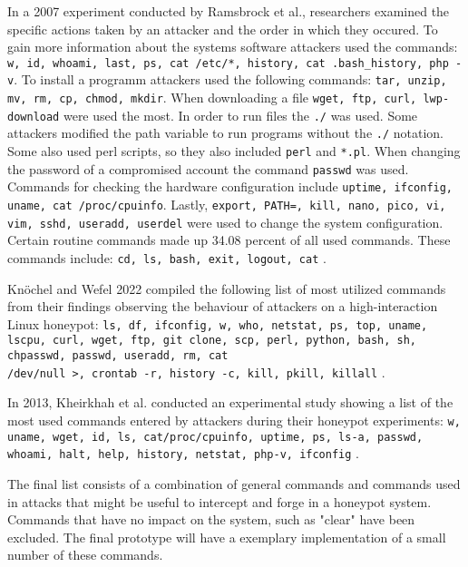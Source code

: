 In a 2007 experiment conducted by Ramsbrock et al., researchers examined the specific actions taken by an attacker and the order in which they occured. To gain more information about the systems software attackers used the commands: \newline 
\texttt{w, id, whoami, last, ps, cat /etc/*, history, cat .bash\_history, php -v}. \newline
To install a programm attackers used the following commands: \newline 
\texttt{tar, unzip, mv, rm, cp, chmod, mkdir}. \newline
When downloading a file \texttt{wget, ftp, curl, lwp-download} were used the most. In order to run files the \texttt{./} was used. Some attackers modified the path variable to run programs without the \texttt{./} notation. Some also used perl scripts, so they also included \texttt{perl} and \texttt{*.pl}. When changing the password of a compromised account the command \texttt{passwd} was used. Commands for checking the hardware configuration include \texttt{uptime, ifconfig, uname, cat /proc/cpuinfo}. Lastly, \texttt{export, PATH=, kill, nano, pico, vi, vim, sshd, useradd, userdel} were used to change the system configuration. Certain routine commands made up 34.08 percent of all used commands. These commands include: \texttt{cd, ls, bash, exit, logout, cat} \cite{4272962}.

Knöchel and Wefel 2022 compiled the following list of most utilized commands from their findings observing the behaviour of attackers on a high-interaction Linux honeypot: \newline
\texttt{ls, df, ifconfig, w, who, netstat, ps, top, uname, lscpu, curl, wget, ftp, git clone, scp, perl, python, bash, sh, chpasswd, passwd, useradd, rm, cat \\/dev/null >, crontab -r, history -c, kill, pkill, killall} \cite{9943718}.

In 2013, Kheirkhah et al. conducted an experimental study showing a list of the most used commands entered by attackers during their honeypot experiments: \newline 
\texttt{w, uname, wget, id, ls, cat/proc/cpuinfo, uptime, ps, ls-a, passwd, whoami, halt, help, history, netstat, php-v, ifconfig} \cite{Kheirkhah13}.

The final list consists of a combination of general commands and commands used in attacks that might be useful to intercept and forge in a honeypot system. Commands that have no impact on the system, such as "clear" have been excluded. The final prototype will have a exemplary implementation of a small number of these commands.

